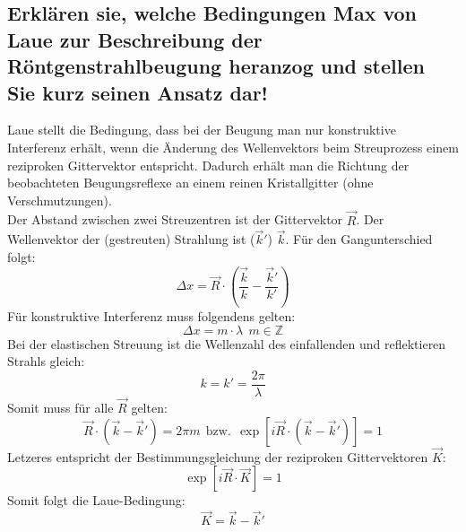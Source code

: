 \subsection*{Erklären sie, welche Bedingungen Max von Laue zur Beschreibung der Röntgenstrahlbeugung heranzog und stellen Sie kurz seinen Ansatz dar!}
Laue stellt die Bedingung, dass bei der Beugung man nur konstruktive Interferenz erhält, wenn die Änderung des Wellenvektors beim Streuprozess einem reziproken Gittervektor entspricht.
Dadurch erhält man die Richtung der beobachteten Beugungsreflexe an einem reinen Kristallgitter (ohne Verschmutzungen).\\
Der Abstand zwischen zwei Streuzentren ist der Gittervektor $\vec{R}$. Der Wellenvektor der (gestreuten) Strahlung ist ($\vec{k}'$) $\vec{k}$. Für den Gangunterschied folgt:
\begin{equation}
    \Delta x = \vec{R}\cdot\left(\frac{\vec{k}}{k}-\frac{\vec{k}'}{k'}\right)
\end{equation}
Für konstruktive Interferenz muss folgendens gelten:
\begin{equation}
    \Delta x = m\cdot\lambda\:\:m\in\mathbb{Z}
\end{equation}
Bei der elastischen Streuung ist die Wellenzahl des einfallenden und reflektieren Strahls gleich:
\begin{equation}
    k=k'=\frac{2\pi}{\lambda}
\end{equation}
Somit muss für alle $\vec{R}$ gelten:
\begin{equation}
    \vec{R}\cdot\left(\vec{k}-\vec{k}'\right)=2\pi m\:\:\text{bzw.}\:\:\exp\left[i\vec{R}\cdot\left(\vec{k}-\vec{k}'\right)\right] = 1
\end{equation}
Letzeres entspricht der Bestimmungsgleichung der reziproken Gittervektoren $\vec{K}$:
\begin{equation}
    \exp\left[i\vec{R}\cdot\vec{K}\right]=1
\end{equation}
Somit folgt die Laue-Bedingung:
\begin{equation}
    \vec{K}=\vec{k}-\vec{k}'
\end{equation}
\newpage
